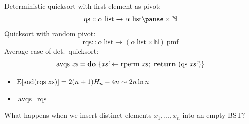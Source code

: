 \documentclass[%
	sans,
	12pt,
]{beamer}
\newcommand{\expectation}{\text{\upshape E}}
\begin{document}
\begin{frame}
Deterministic quicksort with first element as pivot:
\[\text{qs} :: \alpha\ \text{list} \to \alpha\ \text{list}\pause \times \mathbb{N}\]\pause
Quicksort with random pivot:
\[\text{rqs} :: \alpha\ \text{list} \to (\alpha\ \text{list} \times \mathbb{N})\ \text{pmf}\]\pause
Average-case of det.\ quicksort:
\[\text{avqs}\ \textit{xs} = \textbf{do}\ \{\textit{xs'} \leftarrow \text{rperm}\ \textit{xs}\hskip0.2mm;\ \textbf{return}\ (\text{qs}\ \textit{xs'}\hskip0.2mm)\}\]\pause
\vspace*{-1.5em}
\begin{theorem}
\upshape
\begin{itemize}
\item $\expectation[\text{snd}(\text{rqs}\ \text{xs})] = 2(n+1) H_n - 4n \sim 2 n \ln n$\pause
\item $\text{avqs} = \text{rqs}$
\end{itemize}
\end{theorem}
\end{frame}

\begin{frame}
What happens when we insert distinct elements $x_1, \ldots, x_n$ into an empty BST?\\[2em]
\begin{center}
\hspace*{2em}
\end{center}
\end{frame}
\end{document}
